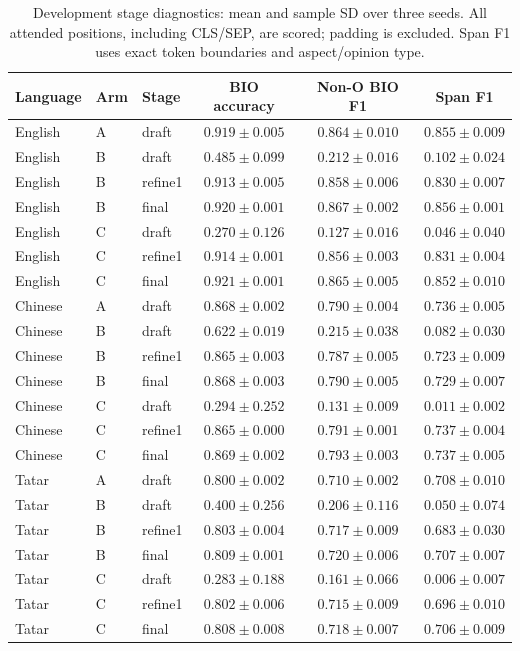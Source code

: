 \begin{table}[htbp]
\centering\small
\setlength{\tabcolsep}{3pt}
\caption{Development stage diagnostics: mean and sample SD over three seeds. All attended positions, including CLS/SEP, are scored; padding is excluded. Span F1 uses exact token boundaries and aspect/opinion type.}\label{tab:stagesfull}
\begin{tabular}{lllccc}
\toprule
Language & Arm & Stage & BIO accuracy & Non-O BIO F1 & Span F1 \\
\midrule
English & A & draft & $0.919\pm0.005$ & $0.864\pm0.010$ & $0.855\pm0.009$ \\
English & B & draft & $0.485\pm0.099$ & $0.212\pm0.016$ & $0.102\pm0.024$ \\
English & B & refine1 & $0.913\pm0.005$ & $0.858\pm0.006$ & $0.830\pm0.007$ \\
English & B & final & $0.920\pm0.001$ & $0.867\pm0.002$ & $0.856\pm0.001$ \\
English & C & draft & $0.270\pm0.126$ & $0.127\pm0.016$ & $0.046\pm0.040$ \\
English & C & refine1 & $0.914\pm0.001$ & $0.856\pm0.003$ & $0.831\pm0.004$ \\
English & C & final & $0.921\pm0.001$ & $0.865\pm0.005$ & $0.852\pm0.010$ \\
Chinese & A & draft & $0.868\pm0.002$ & $0.790\pm0.004$ & $0.736\pm0.005$ \\
Chinese & B & draft & $0.622\pm0.019$ & $0.215\pm0.038$ & $0.082\pm0.030$ \\
Chinese & B & refine1 & $0.865\pm0.003$ & $0.787\pm0.005$ & $0.723\pm0.009$ \\
Chinese & B & final & $0.868\pm0.003$ & $0.790\pm0.005$ & $0.729\pm0.007$ \\
Chinese & C & draft & $0.294\pm0.252$ & $0.131\pm0.009$ & $0.011\pm0.002$ \\
Chinese & C & refine1 & $0.865\pm0.000$ & $0.791\pm0.001$ & $0.737\pm0.004$ \\
Chinese & C & final & $0.869\pm0.002$ & $0.793\pm0.003$ & $0.737\pm0.005$ \\
Tatar & A & draft & $0.800\pm0.002$ & $0.710\pm0.002$ & $0.708\pm0.010$ \\
Tatar & B & draft & $0.400\pm0.256$ & $0.206\pm0.116$ & $0.050\pm0.074$ \\
Tatar & B & refine1 & $0.803\pm0.004$ & $0.717\pm0.009$ & $0.683\pm0.030$ \\
Tatar & B & final & $0.809\pm0.001$ & $0.720\pm0.006$ & $0.707\pm0.007$ \\
Tatar & C & draft & $0.283\pm0.188$ & $0.161\pm0.066$ & $0.006\pm0.007$ \\
Tatar & C & refine1 & $0.802\pm0.006$ & $0.715\pm0.009$ & $0.696\pm0.010$ \\
Tatar & C & final & $0.808\pm0.008$ & $0.718\pm0.007$ & $0.706\pm0.009$ \\
\bottomrule
\end{tabular}
\end{table}
